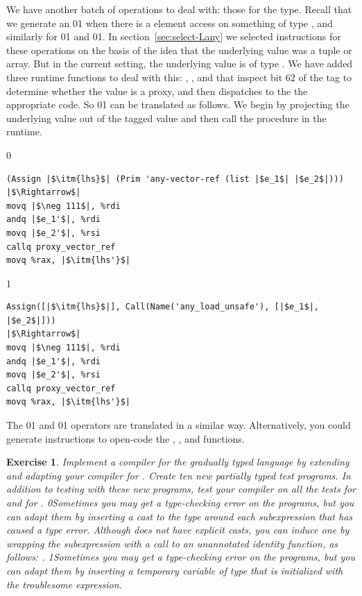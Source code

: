 \documentclass[7x10]{TimesAPriori_MIT}%
\def\racketEd{0}
\def\pythonEd{1}
\def\edition{1}
\newcommand{\racket}[1]{{\if\edition\racketEd{#1}\fi}}
\newcommand{\pythonColor}[0]{}
\newcommand{\python}[1]{{\if\edition\pythonEd\pythonColor #1\fi}}
\newtheorem{exercise}[theorem]{Exercise}
\numberwithin{theorem}{chapter}
\numberwithin{definition}{chapter}
\numberwithin{equation}{chapter}
\begin{document}
We have another batch of operations to deal with: those for the
\CANYTY{} type. Recall that we generate an
\racket{}\python{} when
there is a element access on something of type \CANYTY{}, and
similarly for
\racket{}\python{} and
\racket{}\python{}. In
section~\ref{sec:select-Lany} we selected instructions for these
operations on the basis of the idea that the underlying value was a tuple or
array. But in the current setting, the underlying value is of type
\PTUPLETYNAME{}\python{ or \PARRAYTYNAME{}}.  We have added three runtime
functions to deal with this:
,
, and
 that inspect bit $62$ of the tag
to determine whether the value is a proxy, and then
dispatches to the the appropriate code.
%
So \racket{}\python{}
can be translated as follows.
We begin by projecting the underlying value out of the tagged value and
then call the  procedure in the runtime.
{\if\edition\racketEd
\begin{lstlisting}
(Assign |$\itm{lhs}$| (Prim 'any-vector-ref (list |$e_1$| |$e_2$|)))
|$\Rightarrow$|
movq |$\neg 111$|, %rdi
andq |$e_1'$|, %rdi
movq |$e_2'$|, %rsi
callq proxy_vector_ref
movq %rax, |$\itm{lhs'}$|
\end{lstlisting}
\fi}
{\if\edition\pythonEd\pythonColor
\begin{lstlisting}
Assign([|$\itm{lhs}$|], Call(Name('any_load_unsafe'), [|$e_1$|, |$e_2$|]))
|$\Rightarrow$|
movq |$\neg 111$|, %rdi
andq |$e_1'$|, %rdi
movq |$e_2'$|, %rsi
callq proxy_vector_ref
movq %rax, |$\itm{lhs'}$|
\end{lstlisting}
\fi}
\noindent The \racket{}\python{}
and \racket{}\python{} operators 
are translated in a similar way. Alternatively, you could generate
instructions to open-code
the , ,
and  functions.

\begin{exercise}\normalfont\normalsize
  Implement a compiler for the gradually typed \LangGrad{} language by
  extending and adapting your compiler for \LangLam{}. Create ten new
  partially typed test programs. In addition to testing with these
  new programs, test your compiler on all the tests for \LangLam{}
  and for \LangDyn{}.
%
  \racket{Sometimes you may get a type-checking error on the
    \LangDyn{} programs, but you can adapt them by inserting a cast to
    the \CANYTY{} type around each subexpression that has caused a type
    error. Although \LangDyn{} does not have explicit casts, you can
    induce one by wrapping the subexpression \code{e} with a call to
    an unannotated identity function, as follows: \code{((lambda (x) x) e)}.}
%
  \python{Sometimes you may get a type-checking error on the
    \LangDyn{} programs, but you can adapt them by inserting a
    temporary variable of type \CANYTY{} that is initialized with the
    troublesome expression.}
\end{exercise}
\end{document}

